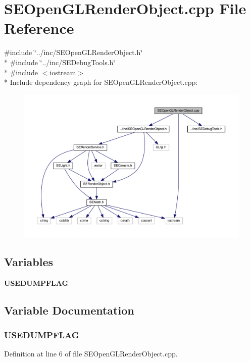 \section{S\+E\+Open\+G\+L\+Render\+Object.\+cpp File Reference}
\label{_s_e_open_g_l_render_object_8cpp}
{\ttfamily \#include \char`\"{}../inc/\+S\+E\+Open\+G\+L\+Render\+Object.\+h\char`\"{}}\\*
{\ttfamily \#include \char`\"{}../inc/\+S\+E\+Debug\+Tools.\+h\char`\"{}}\\*
{\ttfamily \#include $<$iostream$>$}\\*
Include dependency graph for S\+E\+Open\+G\+L\+Render\+Object.\+cpp\+:
\nopagebreak
\begin{figure}[H]
\begin{center}
\leavevmode
\includegraphics[width=350pt]{_s_e_open_g_l_render_object_8cpp__incl}
\end{center}
\end{figure}
\subsection*{Variables}
\begin{DoxyCompactItemize}
\item 
{\bf U\+S\+E\+D\+U\+M\+P\+F\+L\+A\+G}
\end{DoxyCompactItemize}


\subsection{Variable Documentation}
\subsubsection[{U\+S\+E\+D\+U\+M\+P\+F\+L\+A\+G}]{\setlength{\rightskip}{0pt plus 5cm}U\+S\+E\+D\+U\+M\+P\+F\+L\+A\+G}\label{_s_e_open_g_l_render_object_8cpp_adf706a38197b60bc3bf6b16557554414}


Definition at line 6 of file S\+E\+Open\+G\+L\+Render\+Object.\+cpp.

